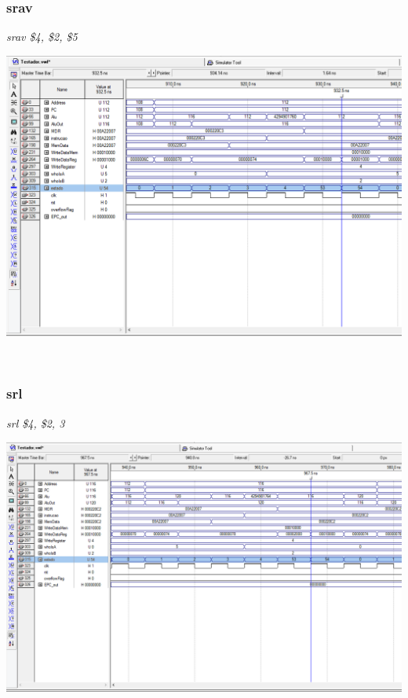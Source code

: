 \documentclass{article}
\begin{document}
    \subsubsection{srav}
    {\it srav \$4, \$2, \$5}\\
    \begin{center}
        \includegraphics[scale=0.25]{srav.PNG}
    \end{center}
    
    \\    
    \subsubsection{srl}
    {\it srl \$4, \$2, 3}\\
    \begin{center}
        \includegraphics[scale=0.25]{srl.PNG}
    \end{center}
    
\end{document}
